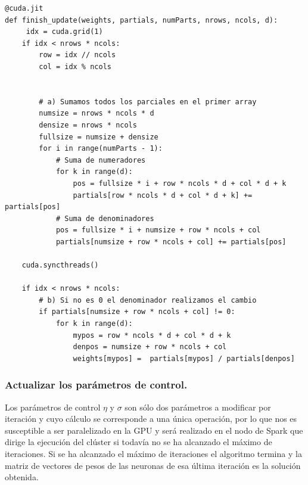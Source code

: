 \begin{code}
\begin{verbatim}
@cuda.jit
def finish_update(weights, partials, numParts, nrows, ncols, d):
     idx = cuda.grid(1)
    if idx < nrows * ncols:
        row = idx // ncols
        col = idx % ncols
        
        
        # a) Sumamos todos los parciales en el primer array
        numsize = nrows * ncols * d
        densize = nrows * ncols
        fullsize = numsize + densize
        for i in range(numParts - 1):
            # Suma de numeradores
            for k in range(d):
                pos = fullsize * i + row * ncols * d + col * d + k
                partials[row * ncols * d + col * d + k] += partials[pos]
            # Suma de denominadores
            pos = fullsize * i + numsize + row * ncols + col
            partials[numsize + row * ncols + col] += partials[pos]
            
    cuda.syncthreads()
    
    if idx < nrows * ncols:
        # b) Si no es 0 el denominador realizamos el cambio
        if partials[numsize + row * ncols + col] != 0:
            for k in range(d):
                mypos = row * ncols * d + col * d + k
                denpos = numsize + row * ncols + col
                weights[mypos] =  partials[mypos] / partials[denpos]
\end{verbatim}
\label{code:ending}
\end{code}

\subsubsection{Actualizar los parámetros de control.}
Los parámetros de control $\eta$ y $\sigma$ son sólo dos parámetros a modificar por iteración y cuyo cálculo se corresponde a una única operación, por lo que nos es susceptible a ser paralelizado en la GPU y será realizado en el nodo de Spark que dirige la ejecución del clúster si todavía no se ha alcanzado el máximo de iteraciones.
Si se ha alcanzado el máximo de iteraciones el algoritmo termina y la matriz de vectores de pesos de las neuronas de esa última iteración es la solución obtenida.

